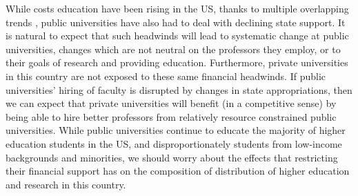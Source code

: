\documentclass[notitlepage,12pt]{article}
\begin{document}
While costs education have been rising in the US, thanks to multiple overlapping trends \citep{ehrenberg2012}, public universities have also had to deal with declining state support.
It is natural to expect that such headwinds will lead to systematic change at public universities, changes which are not neutral on the professors they employ, or to their goals of research and providing education.
Furthermore, private universities in this country are not exposed to these same financial headwinds.
If public universities' hiring of faculty is disrupted by changes in state appropriations, then we can expect that private universities will benefit (in a competitive sense) by being able to hire better professors from relatively resource constrained public universities.
While public universities continue to educate the majority of higher education students in the US, and disproportionately students from low-income backgrounds and minorities, we should worry about the effects that restricting their financial support has on the composition of distribution of higher education and research in this country.
\end{document}
